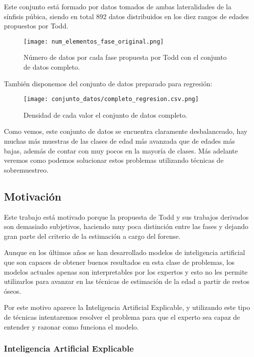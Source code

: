 Este conjunto está formado por datos tomados de ambas lateralidades de la sínfisis púbica, siendo en total 892 datos distribuidos en los diez rangos de edades propuestos por Todd.

\begin{figure}[H]
	\centering
	\texttt{[image: num\_elementos\_fase\_original.png]}
	\caption{Número de datos por cada fase propuesta por Todd con el conjunto de datos completo.}
	\label{fig:conteo_original}
\end{figure}

También disponemos del conjunto de datos preparado para regresión:

\begin{figure}[H]
	\centering
	\texttt{[image: conjunto\_datos/completo\_regresion.csv.png]}
	\caption{Densidad de cada valor el conjunto de datos completo.}
	\label{fig:conjunto_regresion}
\end{figure}

Como vemos, este conjunto de datos se encuentra claramente desbalanceado, hay muchas más muestras de las clases de edad más avanzada que de edades más bajas, además de contar con muy pocos en la mayoría de clases. Más adelante veremos como podemos solucionar estos problemas utilizando técnicas de sobremuestreo.

\subsection{Motivación}

Este trabajo está motivado porque la propuesta de Todd y sus trabajos derivados son demasiado subjetivos, haciendo muy poca distinción entre las fases y dejando gran parte del criterio de la estimación a cargo del forense.

Aunque en los últimos años se han desarrollado modelos de inteligencia artificial que son capaces de obtener buenos resultados en esta clase de problemas, los modelos actuales apenas son interpretables por los expertos y esto no les permite utilizarlos para avanzar en las técnicas de estimación de la edad a partir de restos óseos.

Por este motivo aparece la Inteligencia Artificial Explicable, y utilizando este tipo de técnicas intentaremos resolver el problema para que el experto sea capaz de entender y razonar como funciona el modelo.


\subsubsection{Inteligencia Artificial Explicable}

